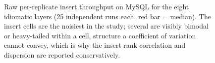 \begin{figure}[htbp]
  \caption{Raw per-replicate insert throughput on MySQL for the eight idiomatic layers
    (25 independent runs each, red bar = median). The insert cells are the noisiest in
    the study; several are visibly bimodal or heavy-tailed within a cell, structure a
    coefficient of variation cannot convey, which is why the insert rank correlation and
    dispersion are reported conservatively.}
  \label{fig:insert_dispersion}
\end{figure}

